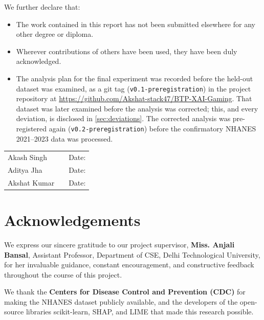 \documentclass[12pt, a4paper, oneside]{report}
\theoremstyle{definition}
\begin{document}
We further declare that:
\begin{itemize}
  \item The work contained in this report has not been submitted elsewhere
        for any other degree or diploma.
  \item Wherever contributions of others have been used, they have been
        duly acknowledged.
  \item The analysis plan for the final experiment was recorded before
        the held-out dataset was examined, as a git tag
        (\texttt{v0.1-preregistration}) in the project repository at
        \url{https://github.com/Akshat-stack47/BTP-XAI-Gaming}. That
        dataset was later examined before the analysis was corrected;
        this, and every deviation, is disclosed in
        \cref{sec:deviations}. The corrected analysis was pre-registered
        again (\texttt{v0.2-preregistration}) before the confirmatory
        NHANES 2021--2023 data was processed.
\end{itemize}

\vspace{2cm}
\noindent
\begin{tabular}{lll}
  Akash Singh  & \underline{\hspace{4cm}} & Date: \underline{\hspace{2.5cm}} \\[0.8cm]
  Aditya Jha   & \underline{\hspace{4cm}} & Date: \underline{\hspace{2.5cm}} \\[0.8cm]
  Akshat Kumar & \underline{\hspace{4cm}} & Date: \underline{\hspace{2.5cm}} \\
\end{tabular}

\chapter*{Acknowledgements}

We express our sincere gratitude to our project supervisor,
\textbf{Miss. Anjali Bansal}, Assistant Professor, Department of CSE,
Delhi Technological University, for her invaluable guidance, constant
encouragement, and constructive feedback throughout the course of this
project.

We thank the \textbf{Centers for Disease Control and Prevention (CDC)}
for making the NHANES dataset publicly available, and the developers of
the open-source libraries scikit-learn, SHAP, and LIME that made this
research possible.
\end{document}
